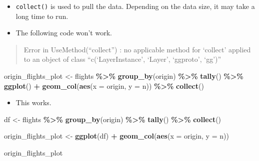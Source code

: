 \documentclass[
]{book}
\newenvironment{Shaded}{\begin{snugshade}}{\end{snugshade}}
\newcommand{\AttributeTok}[1]{\textcolor[rgb]{0.13,0.29,0.53}{#1}}
\newcommand{\FunctionTok}[1]{\textcolor[rgb]{0.13,0.29,0.53}{\textbf{#1}}}
\newcommand{\NormalTok}[1]{#1}
\newcommand{\OtherTok}[1]{\textcolor[rgb]{0.56,0.35,0.01}{#1}}
\newcommand{\SpecialCharTok}[1]{\textcolor[rgb]{0.81,0.36,0.00}{\textbf{#1}}}
\providecommand{\tightlist}{%
  \setlength{\itemsep}{0pt}\setlength{\parskip}{0pt}}
\begin{document}
\begin{itemize}
\item
  \texttt{collect()} is used to pull the data. Depending on the data size, it may take a long time to run.
\item
  The following code won't work.
\end{itemize}

\begin{quote}
Error in UseMethod(``collect'') : no applicable method for `collect' applied to an object of class ``c(`LayerInstance', `Layer', `ggproto', `gg')''
\end{quote}

\begin{Shaded}
\begin{Highlighting}[]
\NormalTok{origin\_flights\_plot }\OtherTok{\textless{}{-}}\NormalTok{ flights }\SpecialCharTok{\%\textgreater{}\%}
  \FunctionTok{group\_by}\NormalTok{(origin) }\SpecialCharTok{\%\textgreater{}\%}
  \FunctionTok{tally}\NormalTok{() }\SpecialCharTok{\%\textgreater{}\%}
  \FunctionTok{ggplot}\NormalTok{() }\SpecialCharTok{+}
  \FunctionTok{geom\_col}\NormalTok{(}\FunctionTok{aes}\NormalTok{(}\AttributeTok{x =}\NormalTok{ origin, }\AttributeTok{y =}\NormalTok{ n)) }\SpecialCharTok{\%\textgreater{}\%}
  \FunctionTok{collect}\NormalTok{()}
\end{Highlighting}
\end{Shaded}

\begin{itemize}
\tightlist
\item
  This works.
\end{itemize}

\begin{Shaded}
\begin{Highlighting}[]
\NormalTok{df }\OtherTok{\textless{}{-}}\NormalTok{ flights }\SpecialCharTok{\%\textgreater{}\%}
  \FunctionTok{group\_by}\NormalTok{(origin) }\SpecialCharTok{\%\textgreater{}\%}
  \FunctionTok{tally}\NormalTok{() }\SpecialCharTok{\%\textgreater{}\%}
  \FunctionTok{collect}\NormalTok{()}

\NormalTok{origin\_flights\_plot }\OtherTok{\textless{}{-}} \FunctionTok{ggplot}\NormalTok{(df) }\SpecialCharTok{+}
  \FunctionTok{geom\_col}\NormalTok{(}\FunctionTok{aes}\NormalTok{(}\AttributeTok{x =}\NormalTok{ origin, }\AttributeTok{y =}\NormalTok{ n))}

\NormalTok{origin\_flights\_plot}
\end{Highlighting}
\end{Shaded}
\end{document}
